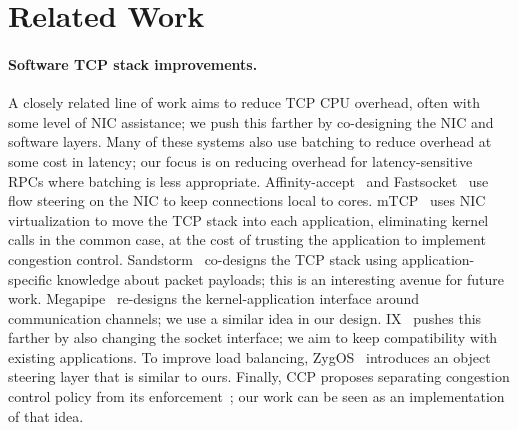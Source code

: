 \section{Related Work}


\paragraph{Software TCP stack improvements.}
A closely related line of work aims to reduce TCP CPU overhead,
often with some level of NIC assistance; we push this farther by 
co-designing the NIC and software layers.
Many of these systems also use batching to reduce overhead at some cost in
latency; our focus is on reducing overhead for latency-sensitive RPCs 
where batching is less appropriate. 
Affinity-accept~\cite{affinity-accept} and Fastsocket~\cite{fastsocket} 
use flow steering on the NIC to keep connections local to cores. 
mTCP~\cite{mtcp} uses NIC virtualization to move the TCP stack
into each application, eliminating kernel calls in the common case,  
at the cost of trusting the application to implement congestion control.
Sandstorm~\cite{sandstorm} co-designs the TCP stack using 
application-specific knowledge about packet payloads; this is an interesting 
avenue for future work.
Megapipe~\cite{megapipe} re-designs the kernel-application interface 
around communication channels; we use a similar idea in our design. 
IX~\cite{belay:ix} pushes this farther by also changing the socket interface;
we aim to keep compatibility with existing applications.  To
improve load balancing, ZygOS~\cite{zygos} introduces an object steering 
layer that is similar to ours. Finally, CCP proposes separating congestion
control policy from its enforcement~\cite{ccp}; our work can be seen
as an implementation of that idea.

